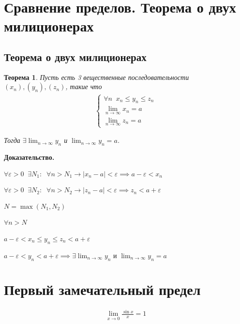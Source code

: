 \documentclass[a4paper,12pt]{extbook}
\theoremstyle{named}
\newtheorem*{theorem}{Теорема}
\theoremstyle{named}
\newcommand{\newpar}{$ $\par\nobreak\ignorespaces}
\renewenvironment{proof}[1][]{\noindent\textbf{Доказательство\if\relax\detokenize{#1}\relax\else\;#1\fi.} \newpar}{\bigskip}
\begin{document}
\section{Сравнение пределов. Теорема о двух милиционерах}%
\label{sec:Сравнение пределов. Теорема о двух милиционерах}

\subsection*{Теорема о двух милиционерах}%
\label{sub:Теорема о двух милиционерах}
\begin{theorem}
    Пусть есть 3 вещественные последовательности \((x_n), (y_n), (z_n)\), такие что
    \begin{gather*}
        \begin{cases}
            \forall n \;\; x_n \leq y_n \leq z_n        \\
            \displaystyle{\lim_{n \to \infty}{x_n}} = a \\
            \displaystyle{\lim_{n \to \infty}{z_n}} = a
        \end{cases}
    \end{gather*}

    Тогда \(\exists \displaystyle{\lim_{n \to \infty}{y_n}}\) и  \(\displaystyle{\lim_{n \to \infty}{y_n}} = a\).
\end{theorem}

\begin{proof}
    \(
    \forall \varepsilon > 0 \;\; \exists N_1: \;\; \forall n > N_1 \rightarrow |x_n - a| < \varepsilon \implies a - \varepsilon < x_n
    \)

    \(
    \forall \varepsilon > 0 \;\; \exists N_2: \;\; \forall n > N_2 \rightarrow |z_n - a| < \varepsilon \implies z_n < a + \varepsilon
    \)

    \(N = \max(N_1, N_2)\)

    \medskip

    \(\forall n > N\)

    \(a - \varepsilon < x_n \leq y_n \leq z_n < a + \varepsilon\)

    \(a - \varepsilon < y_n < a + \varepsilon \implies \exists \displaystyle{\lim_{n \to \infty}{y_n}} \text{ и } \displaystyle{\lim_{n \to \infty}{y_n}} = a\)
\end{proof}

\section{Первый замечательный предел}\label{sec:limit_1}
\begin{gather*}
    \lim_{x \to 0}{\frac{\sin{x}}{x}} = 1
\end{gather*}
\end{document}
